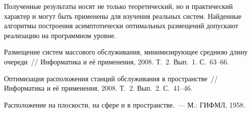 \begin{multicols}{2}
Полученные результаты носят не только теоретический, но и практический характер и могут быть 
применены для изучения реальных систем. Найденные алгоритмы построения асимптотически оптимальных 
размещений допускают реализацию на программном уровне.

{\small\frenchspacing
{%
\begin{thebibliography}{9}


Размещение систем массового обслуживания, минимизирующее среднюю длину очереди~// Информатика и её применения, 2008. 
Т.~2. Вып.~1. С.~63--66.

Оптимизация расположения станций обслуживания в пространстве~// Информатика и её применения, 2008. Т.~2. Вып.~2. С.~41--46.


\label{end\stat}

Расположение на плоскости, на сфере и в пространстве.~--- М.: ГИФМЛ, 1958.




 \end{thebibliography}
}
}


\end{multicols}